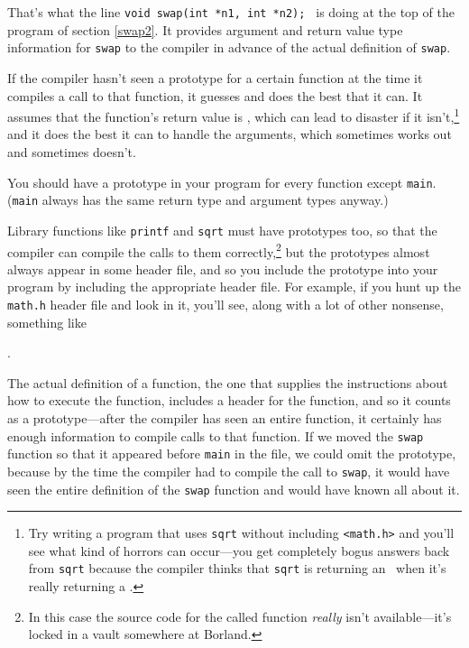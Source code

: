 That's what the line {\tt void swap(int *n1, int *n2); } is doing at the
top of the program of section \ref{swap2}.  It provides argument and
return value type information for {\tt swap} to the compiler in
advance of the actual definition of {\tt swap}.

If the compiler hasn't seen a prototype for a certain function at the
time it compiles a call to that function, it guesses and does the best
that it can.  It assumes that the function's return value is \int, which
can lead to disaster if it isn't,\footnote{Try writing a program that
uses {\tt sqrt} without including {\tt <math.h>} and you'll see what
kind of horrors can occur---you get completely bogus answers back from
{\tt sqrt} because the compiler thinks that {\tt sqrt} is returning an
\int\ when it's really returning a \double.} and it does the best it can
to handle the arguments, which sometimes works out and sometimes
doesn't.  

You should have a prototype in your program for every function except
{\tt main}.  ({\tt main} always has the same return type and
argument types anyway.)

Library functions like {\tt printf} and {\tt sqrt} must have prototypes
too, so that the compiler can compile the calls to them
correctly,\footnote{In this case the source code for the called function
{\em really}\/ isn't available---it's locked in a vault somewhere at
Borland.} but the prototypes almost always appear in some header file,
and so you include the prototype into your program by including the
appropriate header file.  For example, if you hunt up the {\tt math.h}
header file and look in it, you'll see, along with a lot of other
nonsense, something like

\begin{flushleft}
\verb% double sqrt(double arg); %
\end{flushleft}
\noindent .

The actual definition of a function, the one that supplies the
instructions about how to execute the function, includes a header for
the function, and so it counts as a prototype---after the compiler has
seen an entire function, it certainly has enough information to compile
calls to that function.  If we moved the {\tt swap} function so that it
appeared before {\tt main} in the file, we could omit the prototype,
because by the time the compiler had to compile the call to {\tt swap},
it would have seen the entire definition of the {\tt swap} function and
would have known all about it.

